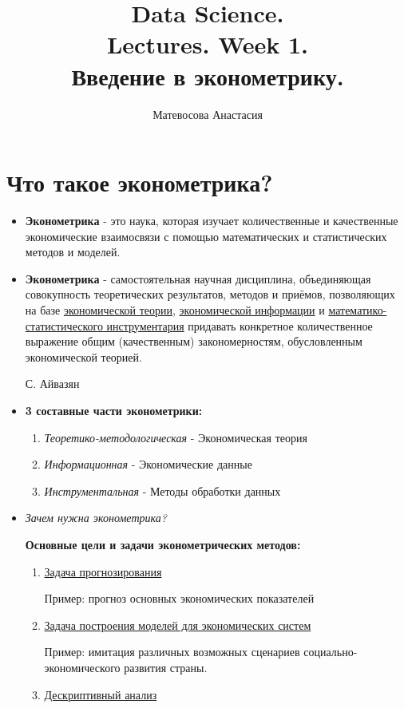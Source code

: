 \documentclass{article}
\title{Data Science.\\
Lectures. Week 1. \\
Введение в эконометрику.}
\author{Матевосова Анастасия}
\begin{document}
\maketitle

\setcounter{tocdepth}{3} 
\renewcommand\contentsname{Contents}
\tableofcontents
\newpage


\section{Что такое эконометрика?}

\begin{itemize}
\item \textbf{Эконометрика} - это наука, которая изучает количественные и качественные экономические взаимосвязи с помощью математических и статистических методов и моделей.
\item \textbf {Эконометрика} - самостоятельная научная дисциплина, объединяющая совокупность теоретических результатов, методов и приёмов, позволяющих на базе \underline{экономической теории}, \underline {экономической информации} и \underline {математико-статистического инструментария} придавать конкретное количественное выражение общим (качественным) закономерностям, обусловленным экономической теорией.
\begin{flushright}
    С. Айвазян
\end{flushright} 
\item \textbf {3 составные части эконометрики:}
\begin{enumerate}
\item \textit{Теоретико-методологическая} - Экономическая теория
\item \textit {Информационная} - Экономические данные
\item \textit {Инструментальная} - Методы обработки данных
\end{enumerate}
\item \textit {Зачем нужна эконометрика?}

\textbf {Основные цели и задачи эконометрических методов:}
\begin{enumerate}
\item \underline {Задача прогнозирования} 

Пример: прогноз основных экономических показателей
\item \underline {Задача построения моделей для экономических систем}

Пример: имитация различных возможных сценариев социально-экономического развития страны.
\item \underline {Дескриптивный анализ}


\end{enumerate}
\end{itemize}
\end{document}

